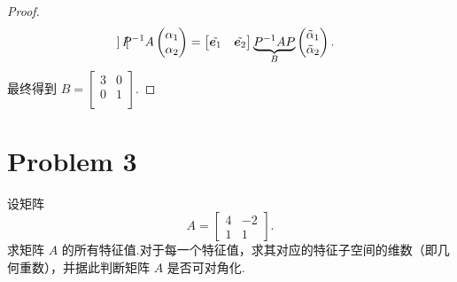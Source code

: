 \begin{proof}
\[\begin{aligned}
\begin{bmatrix}
    \end{bmatrix} P^{-1} A \begin{pmatrix}
        \alpha_1 \\
        \alpha_2 \\
    \end{pmatrix} = \begin{bmatrix}
        \tilde{\boldsymbol{e}_1} & \tilde{\boldsymbol{e}_2} \\
    \end{bmatrix} \underbrace{P^{-1} A P}_{B} \begin{pmatrix}
        \tilde{\alpha}_1 \\
        \tilde{\alpha}_2 \\
    \end{pmatrix}.
\end{aligned}
\]
最终得到 $B = \begin{bmatrix}
    3 & 0 \\
    0 & 1 \\
\end{bmatrix}$.


\end{proof}
\section*{Problem 3}

设矩阵
\[
A =
\begin{bmatrix}
4 & -2 \\
1 & 1
\end{bmatrix}.
\]
求矩阵 $A$ 的所有特征值.对于每一个特征值，求其对应的特征子空间的维数（即几何重数），并据此判断矩阵 $A$ 是否可对角化.

